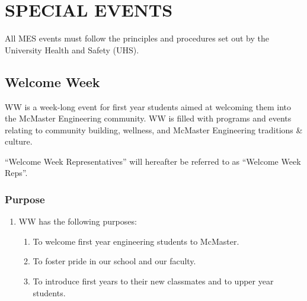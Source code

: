 \hypertarget{special-events}{%
 \section{SPECIAL EVENTS}
 \label{special-events}}
All MES events must follow the principles and procedures set out by the
University Health and Safety (UHS).

\hypertarget{welcome-week}{%
 \subsection{Welcome Week}
 \label{welcome-week}}

WW is a week-long event for first year students aimed at welcoming them
into the McMaster Engineering community. WW is filled with programs and
events relating to community building, wellness, and McMaster
Engineering traditions \& culture.

``Welcome Week Representatives'' will hereafter be referred to as
``Welcome Week Reps''.

\hypertarget{purpose-1}{%
 \subsubsection{Purpose}
 \label{purpose-1}}

\begin{enumerate}
 \item
  WW has the following purposes:

  \begin{enumerate}
   \item
    To welcome first year engineering students to McMaster.
   \item
    To foster pride in our school and our faculty.
   \item
    To introduce first years to their new classmates and to upper year
    students.

  \end{enumerate}
\end{enumerate}

